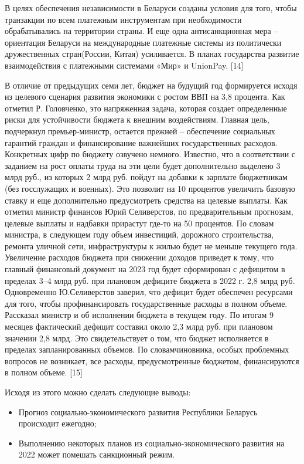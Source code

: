 \documentclass[14pt,a4paper]{article}
\begin{document}
    \par
    В целях обеспечения независимости в Беларуси созданы условия для того, чтобы транзакции по всем платежным инструментам при необходимости обрабатывались на территории страны.
    И еще одна антисанкционная мера – ориентация Беларуси на международные платежные системы из политически дружественных стран(России, Китая) усиливается.
    В планах государства развитие взаимодействия с платежными системами «Мир» и UnionPay. [14]
    \par
    В отличие от предыдущих семи
    лет, бюджет на будущий год формируется исходя из целевого сценария развития экономики с ростом ВВП на 3,8 процента.
    Как отметил Р. Головченко, это напряженная задача, которая создает определенные риски для устойчивости бюджета к внешним воздействиям.
    Главная цель, подчеркнул премьер-министр, остается прежней – обеспечение социальных гарантий граждан и финансирование важнейших государственных расходов.
    Конкретных цифр по бюджету озвучено немного.
    Известно, что в соответствии с заданием на рост оплаты труда на эти цели будет дополнительно выделено 3 млрд руб., из которых 2 млрд руб.
    пойдут на добавки к зарплате бюджетникам (без госслужащих и военных).
    Это позволит на 10 процентов увеличить базовую ставку и еще дополнительно предусмотреть средства на целевые выплаты.
    Как отметил министр финансов Юрий Селиверстов, по предварительным прогнозам, целевые выплаты и надбавки прирастут где-то на 50 процентов.
    По словам министра, в следующем году объем инвестиций, дорожного строительства, ремонта уличной сети, инфраструктуры к жилью будет не меньше текущего года.
    Увеличение расходов бюджета при снижении доходов приведет к тому, что главный финансовый документ на 2023 год будет сформирован с дефицитом в пределах 3–4 млрд руб. при плановом дефиците бюджета в 2022 г. 2,8 млрд руб.
    Одновременно Ю.Селиверстов заверил, что дефицит будет обеспечен ресурсами для того, чтобы профинансировать государственные расходы в полном объеме.
    Рассказал министр и об исполнении бюджета в текущем году.
    По итогам 9 месяцев фактический дефицит составил около 2,3 млрд руб. при плановом значении 2,8 млрд.
    Это свидетельствует о том, что бюджет исполняется в пределах запланированных объемов.
    По словамчиновника, особых проблемных вопросов не возникает, все расходы, предусмотренные бюджетом, финансируются в полном объеме.
    [15]
    \par
    Исходя из этого можно сделать следующие выводы:
    \begin{itemize}
        \item Прогноз социально-экономического развития Республики Беларусь происходит ежегодно;
        \item Выполнению некоторых планов из социально-экономического развития на 2022 может помешать санкционный режим.
    \end{itemize}
\end{document}
